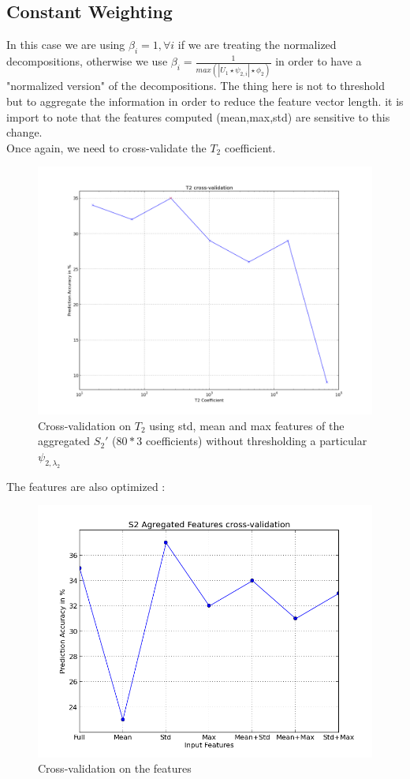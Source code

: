 \documentclass[a4paper]{report}
\begin{document}
\subsection{Constant Weighting}
In this case we are using $\beta_i=1, \forall i$ if we are treating the normalized decompositions, otherwise we use $\beta_i=\frac{1}{max(|U_1 \star \psi_{2,i}|\star \phi_2)}$ in order to have a "normalized version" of the decompositions. The thing here is not to threshold but to aggregate the information in order to reduce the feature vector length. it is import to note that the features computed (mean,max,std) are sensitive to this change. \\
Once again, we need to cross-validate the $T_2$ coefficient.
\begin{figure}[H]
\begin{center}
\includegraphics[scale=0.3]{cross_T2_agregated.png}\caption{Cross-validation on $T_2$ using std, mean and max features of the aggregated $S_2'$ ($80*3$ coefficients) without thresholding a particular $\psi_{2,\lambda_2}$}
\end{center}
\end{figure}
The features are also optimized :
\begin{figure}[H]
\begin{center}
\includegraphics[scale=0.5]{cross_features_S0_S1_agregated.png}\caption{Cross-validation on the features}
\end{center}
\end{figure}
\end{document}
